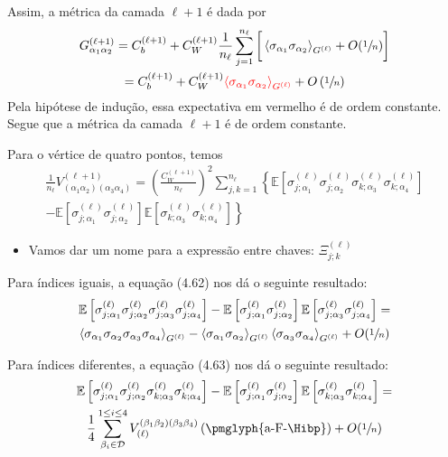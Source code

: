 \documentclass{beamer}
\newcommand{\EE}{\mathbb{E}}
\def\mi#1{{\alpha_{#1}}}
\def\mj#1{\beta_{#1}}
\def\eell{{(\ell)}}
\def\eellum{{(\ell+1)}}
\newcommand{\Gnormal}[3]{{G^{(#1)}_{\mi{#2}\mi{#3}}}}
\newcommand{\Vertice}[5]{V^{(#1)}_{(\mi#2\mi#3)(\mi#4\mi#5)}}
\newcommand{\Verticeinvb}[5]{V_{(#1)}^{(\mj#2\mj#3)(\mj#4\mj#5)}}
\newcommand{\Expectation}[2]{\left\langle #1 \right\rangle_{#2}}
\begin{document}
\begin{frame}
	Assim, a métrica da camada $\ell+1$ é dada por
	\begin{multline*} 
		\Gnormal{\ell+1}12 = C_b^\eellum + C_W^\eellum\frac{1}{n_\ell}\sum_{j=1}^{n_\ell} \bigg[\Expectation{\sigma_\mi1\sigma_\mi2}{G^\eell} + O(\sfrac{1}{n}) \bigg] \\
		= C_b^\eellum + C_W^\eellum{\color{red}\Expectation{\sigma_\mi1\sigma_\mi2}{G^\eell} } + O\left(\sfrac{1}{n}\right)
	\end{multline*}
	Pela hipótese de indução, essa expectativa em vermelho é de ordem constante. Segue que a métrica da camada $\ell+1$ é de ordem constante.
\end{frame}

\begin{frame}
	Para o vértice de quatro pontos, temos
	{\small
	\begin{multline*}
		\frac{1}{n_\ell}\Vertice{\ell+1}1234 =  \left(\frac{C_W^\eellum}{n_\ell}\right)^2 \sum_{j,k=1}^{n_\ell}  \left\{ \EE\left[\sigma_{j;\mi1}^\eell\sigma_{j;\mi2}^\eell \sigma_{k;\mi3}^\eell\sigma_{k;\mi4}^\eell\right] \right. \\
		\left. - \EE\left[\sigma_{j;\mi1}^\eell\sigma_{j;\mi2}^\eell\right]\EE\left[\sigma_{k;\mi3}^\eell\sigma_{k;\mi4}^\eell\right]\right\}
	\end{multline*}
	} 
	\begin{itemize}
		\item Vamos dar um nome para a expressão entre chaves:  $\Xi_{j;k}^\eell$
	\end{itemize}
\end{frame}

\begin{frame}
	Para índices iguais, a equação (4.62) nos dá o seguinte resultado:
	{
\begin{multline*}
	\EE\left[\sigma_{j;\mi1}^\eell\sigma_{j;\mi2}^\eell \sigma_{j;\mi3}^\eell\sigma_{j;\mi4}^\eell\right] - \EE\left[\sigma_{j;\mi1}^\eell\sigma_{j;\mi2}^\eell\right]\EE\left[\sigma_{j;\mi3}^\eell\sigma_{j;\mi4}^\eell\right] = \\
	\Expectation{\sigma_\mi1\sigma_\mi2\sigma_\mi3\sigma_\mi4}{G^\eell} - \Expectation{\sigma_\mi1\sigma_\mi2}{G^\eell}  \Expectation{\sigma_\mi3\sigma_\mi4}{G^\eell}  +  O(\sfrac{1}{n})
\end{multline*}
	}
\end{frame}

\begin{frame}
	Para índices diferentes, a equação (4.63) nos dá o seguinte resultado:
	{\small
	\begin{multline*}
		\EE\left[\sigma_{j;\mi1}^\eell\sigma_{j;\mi2}^\eell \sigma_{k;\mi3}^\eell\sigma_{k;\mi4}^\eell\right] - \EE\left[\sigma_{j;\mi1}^\eell\sigma_{j;\mi2}^\eell\right]\EE\left[\sigma_{k;\mi3}^\eell\sigma_{k;\mi4}^\eell\right] = \\
		\frac{1}{4}\sum_{\mj{i}\in\mathcal{D}}^{1\le{i}\le4}\Verticeinvb{\ell}1234\left(\text{\pmglyph{a-F-\Hibp}}\right)  + O(\sfrac{1}{n})
	\end{multline*}
	}
\end{frame}
\end{document}
